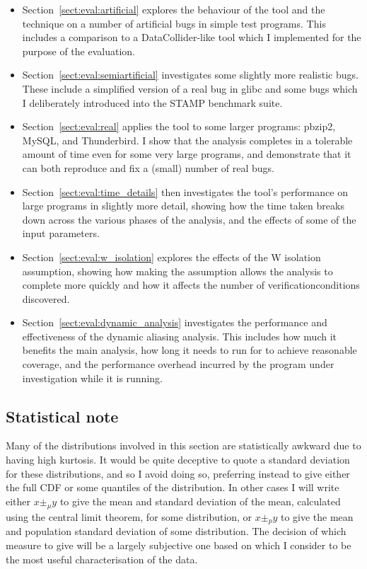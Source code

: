\begin{itemize}
\item Section~\ref{sect:eval:artificial} explores the behaviour of the
  tool and the technique on a number of artificial bugs in simple test
  programs.  This includes a comparison to a
  DataCollider\needCite{}-like tool which I implemented for the
  purpose of the evaluation.
\item Section~\ref{sect:eval:semiartificial} investigates some
  slightly more realistic bugs.  These include a simplified version of
  a real bug in glibc\needCite{} and some bugs which I deliberately
  introduced into the STAMP benchmark suite\needCite{}.
\item Section~\ref{sect:eval:real} applies the tool to some larger
  programs: pbzip2\needCite{}, MySQL\needCite{}, and
  Thunderbird\needCite{}.  I show that the analysis completes in a
  tolerable amount of time even for some very large programs, and
  demonstrate that it can both reproduce and fix a (small) number of
  real bugs.
\item Section~\ref{sect:eval:time_details} then investigates the
  tool's performance on large programs in slightly more detail,
  showing how the time taken breaks down across the various phases of
  the analysis, and the effects of some of the input parameters.
\item Section~\ref{sect:eval:w_isolation} explores the effects of the
  W isolation assumption, showing how making the assumption allows the
  analysis to complete more quickly and how it affects the number of
  \glspl{verificationcondition} discovered.
\item Section~\ref{sect:eval:dynamic_analysis} investigates the
  performance and effectiveness of the dynamic aliasing analysis.
  This includes how much it benefits the main analysis, how long it
  needs to run for to achieve reasonable coverage, and the performance
  overhead incurred by the program under investigation while it is
  running.
\end{itemize}

\subsection{Statistical note}

Many of the distributions involved in this section are statistically
awkward due to having high kurtosis.  It would be quite deceptive to
quote a standard deviation for these distributions, and so I avoid
doing so, preferring instead to give either the full CDF or some
quantiles of the distribution.  In other cases I will write either $x
\pm_\mu y$ to give the mean and standard deviation of the mean,
calculated using the central limit theorem, for some distribution, or
$x \pm_p y$ to give the mean and population standard deviation of some
distribution.  The decision of which measure to give will be a largely
subjective one based on which I consider to be the most useful
characterisation of the data.

